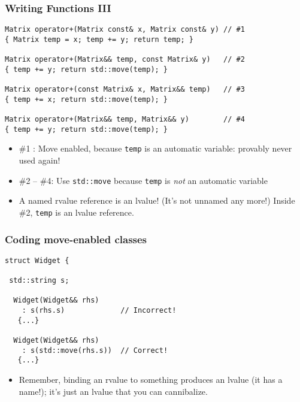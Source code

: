 
\begin{frame}[fragile]
\frametitle{Writing Functions III}
{\scriptsize
\begin{verbatim}
Matrix operator+(Matrix const& x, Matrix const& y) // #1
{ Matrix temp = x; temp += y; return temp; }
 
Matrix operator+(Matrix&& temp, const Matrix& y)   // #2
{ temp += y; return std::move(temp); }
 
Matrix operator+(const Matrix& x, Matrix&& temp)   // #3
{ temp += x; return std::move(temp); }
 
Matrix operator+(Matrix&& temp, Matrix&& y)        // #4
{ temp += y; return std::move(temp); }
\end{verbatim}
}

\begin{itemize}
\item \#1 : Move enabled, because \texttt{temp} is an automatic
  variable: provably never used again!
\item \#2 -- \#4: Use \texttt{std::move} because \texttt{temp} is \emph{not}
  an automatic variable

\item A named rvalue reference is an lvalue! (It's not unnamed any
  more!) Inside \#2, \texttt{temp} is an lvalue reference.
\end{itemize}


\end{frame}



\begin{frame}[fragile]
\frametitle{Coding move-enabled classes}
{\scriptsize
\begin{verbatim}
struct Widget {  

 std::string s;

  Widget(Widget&& rhs)
    : s(rhs.s)             // Incorrect!
   {...}

  Widget(Widget&& rhs)
    : s(std::move(rhs.s))  // Correct!
   {...}
\end{verbatim}
}
\begin{itemize}
\item Remember, binding an rvalue to something produces an lvalue (it
  has a name!); it's just an lvalue that you can cannibalize.
\end{itemize}

\end{frame}



